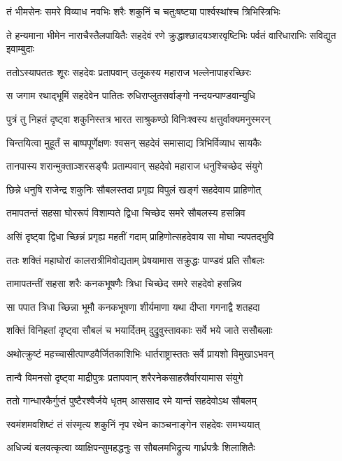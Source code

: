 \twolineshloka
{तं भीमसेनः समरे विव्याध नवभिः शरैः}
{शकुनिं च चतुःषष्ट्या पार्श्वस्थांश्च त्रिभिस्त्रिभिः}


\threelineshloka
{ते हन्यमाना भीमेन नाराचैस्तैलपायितैः}
{सहदेवं रणे क्रुद्धाश्छादयञ्शरवृष्टिभिः}
{पर्वतं वारिधाराभिः सविद्युत इवाम्बुदाः}


\twolineshloka
{ततोऽस्यापततः शूरः सहदेवः प्रतापवान्}
{उलूकस्य महाराज भल्लेनापाहरच्छिरः}


\twolineshloka
{स जगाम रथाद्भूमिं सहदेवेन पातितः}
{रुधिराप्लुतसर्वाङ्गो नन्दयन्पाण्डवान्युधि}


\twolineshloka
{पुत्रं तु निहतं दृष्ट्वा शकुनिस्तत्र भारत}
{साश्रुकण्ठो विनिःश्वस्य क्षत्तुर्वाक्यमनुस्मरन्}


\twolineshloka
{चिन्तयित्वा मुहूर्तं स बाष्पपूर्णेक्षणः श्वसन्}
{सहदेवं समासाद्य त्रिभिर्विव्याध सायकैः}


\twolineshloka
{तानपास्य शरान्मुक्ताञ्शरसङ्घैः प्रताम्पवान्}
{सहदेवो महाराज धनुश्चिच्छेद संयुगे}


\twolineshloka
{छिन्ने धनुषि राजेन्द्र शकुनिः सौबलस्तदा}
{प्रगृह्य विपुलं खङ्गं सहदेवाय प्राहिणोत्}


\twolineshloka
{तमापतन्तं सहसा घोररूपं विशाम्पते}
{द्विधा चिच्छेद समरे सौबलस्य हसन्निव}


\twolineshloka
{असिं दृष्ट्वा द्विधा च्छिन्नं प्रगृह्य महतीं गदाम्}
{प्राहिणोत्सहदेवाय सा मोघा न्यपतद्भुवि}


\twolineshloka
{ततः शक्तिं महाघोरां कालरात्रीमिवोद्यताम्}
{प्रेषयामास सक्रुद्धः पाण्डवं प्रति सौबलः}


\twolineshloka
{तामापतन्तीं सहसा शरैः कनकभूषणैः}
{त्रिधा चिच्छेद समरे सहदेवो हसन्निव}


\twolineshloka
{सा पपात त्रिधा च्छिन्ना भूमौ कनकभूषणा}
{शीर्यमाणा यथा दीप्ता गगनाद्वै शतहदा}


\twolineshloka
{शक्तिं विनिहतां दृष्ट्वा सौबलं च भयार्दितम्}
{दुद्रुवुस्तावकाः सर्वे भये जाते ससौबलाः}


\twolineshloka
{अथोत्क्रुष्टं महच्चासीत्पाण्डवैर्जितकाशिभिः}
{धार्तराष्ट्रास्ततः सर्वे प्रायशो विमुखाऽभवन्}


\twolineshloka
{तान्वै विमनसो दृष्ट्वा माद्रीपुत्रः प्रतापवान्}
{शरैरनेकसाहस्रैर्वारयामास संयुगे}


\twolineshloka
{ततो गान्धारकैर्गुप्तं पुष्टैरश्वैर्जये धृतम्}
{आससाद रमे यान्तं सहदेवोऽथ सौबलम्}


\twolineshloka
{स्वमंशमवशिष्टं तं संस्मृत्य शकुनिं नृप}
{रथेन काञ्चनाङ्गेन सहदेवः समभ्ययात्}


\twolineshloka
{अधिज्यं बलवत्कृत्वा व्याक्षिपन्सुमहद्धनुः}
{स सौबलमभिद्रुत्य गार्ध्रपत्रैः शिलाशितैः}


